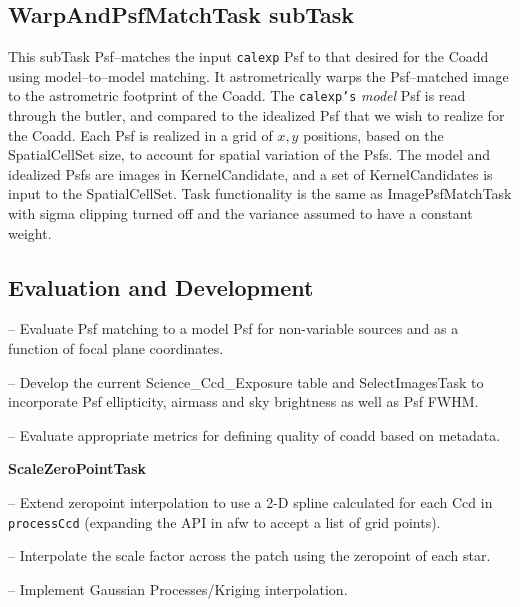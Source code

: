 \documentclass[prd, nofootinbib, floatfix, 11pt,tightenlines,times]{article}
\begin{document}
\subsection{WarpAndPsfMatchTask subTask} 

This subTask Psf--matches the input {\tt calexp} Psf to that desired
for the Coadd using model--to--model matching.
%
It astrometrically warps the Psf--matched image to the astrometric
footprint of the Coadd.  The {\tt calexp's} {\it model} Psf is read
through the butler, and compared to the idealized Psf that we wish to
realize for the Coadd.  Each Psf is realized in a grid of $x,y$
%
positions, based on the SpatialCellSet size, to account for spatial variation of the Psfs.  The model and
idealized Psfs are images in KernelCandidate, and a set of KernelCandidates is input to the
SpatialCellSet. Task functionality is the same as ImagePsfMatchTask with
sigma clipping turned off and the variance 
assumed to have a constant weight.

\subsection{Evaluation and Development}

-- Evaluate Psf matching to a model Psf for non-variable sources and
as a function of focal plane coordinates. 

-- Develop the current Science\_Ccd\_Exposure table and
SelectImagesTask to incorporate  Psf ellipticity, airmass and sky
brightness as well as Psf FWHM.

-- Evaluate appropriate metrics for defining quality of coadd  based
on metadata.


{\bf ScaleZeroPointTask}

-- Extend zeropoint interpolation to use a 2-D spline calculated for each Ccd in {\tt
  processCcd} (expanding  the API in afw to accept a list of grid points).

-- Interpolate the scale factor across the patch using the zeropoint
of each star. 

-- Implement Gaussian Processes/Kriging interpolation.
\end{document}
